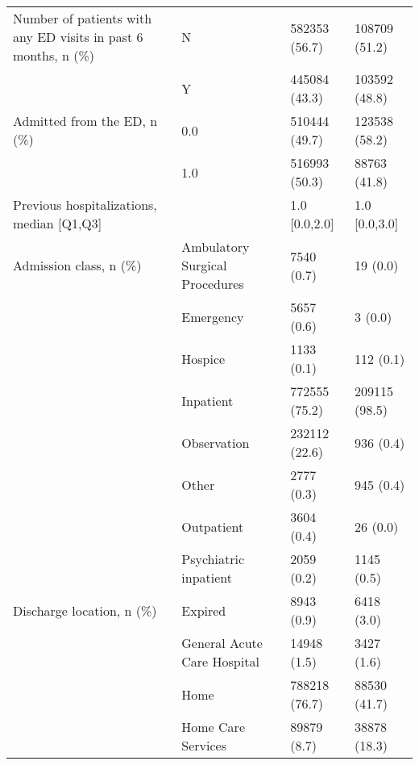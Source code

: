 \begin{tabular}{llll}
Number of patients with any ED visits in past 6 months, n (\%) & N &                         582353 (56.7) &     108709 (51.2) \\
                                       & Y &                         445084 (43.3) &     103592 (48.8) \\
Admitted from the ED, n (\%) & 0.0 &                         510444 (49.7) &     123538 (58.2) \\
                                       & 1.0 &                         516993 (50.3) &      88763 (41.8) \\
Previous hospitalizations, median [Q1,Q3] &   &                         1.0 [0.0,2.0] &     1.0 [0.0,3.0] \\
Admission class, n (\%) & Ambulatory Surgical Procedures &                            7540 (0.7) &          19 (0.0) \\
                                       & Emergency &                            5657 (0.6) &           3 (0.0) \\
                                       & Hospice &                            1133 (0.1) &         112 (0.1) \\
                                       & Inpatient &                         772555 (75.2) &     209115 (98.5) \\
                                       & Observation &                         232112 (22.6) &         936 (0.4) \\
                                       & Other &                            2777 (0.3) &         945 (0.4) \\
                                       & Outpatient &                            3604 (0.4) &          26 (0.0) \\
                                       & Psychiatric inpatient &                            2059 (0.2) &        1145 (0.5) \\
Discharge location, n (\%) & Expired &                            8943 (0.9) &        6418 (3.0) \\
                                       & General Acute Care Hospital &                           14948 (1.5) &        3427 (1.6) \\
                                       & Home &                         788218 (76.7) &      88530 (41.7) \\
                                       & Home Care Services &                           89879 (8.7) &      38878 (18.3) \\

\end{tabular}
